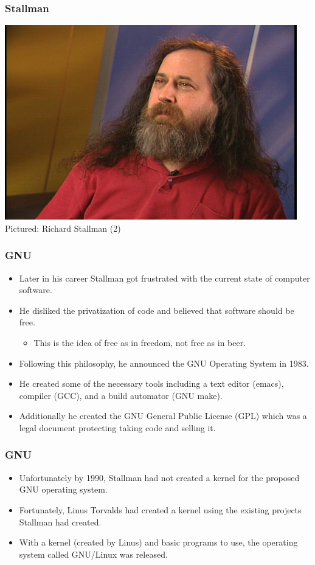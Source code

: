 \documentclass{beamer}
\begin{document}
\begin{frame}\frametitle{Stallman}
  \begin{center}
    \includegraphics[scale=.5, center]{stallman2.jpg}\\
    \small {Pictured: Richard Stallman (2)}
  \end{center}

\end{frame}

\begin{frame}\frametitle{GNU}
  \begin{itemize}
    \item Later in his career Stallman got frustrated with the current state of computer software.
    \item He disliked the privatization of code and believed that software should be free.
    \begin{itemize}
      \item This is the idea of free as in freedom, not free as in beer.
    \end{itemize}
    \item Following this philosophy, he announced the GNU Operating System in 1983.
    \item He created some of the necessary tools including a text editor (emacs), compiler (GCC), and a build automator (GNU make).
    \item Additionally he created the GNU General Public License (GPL) which was a legal document protecting taking code and selling it.
  \end{itemize}
\end{frame}

\begin{frame}\frametitle{GNU}
  \begin{itemize}
    \item Unfortunately by 1990, Stallman had not created a kernel for the proposed GNU operating system.
    \item Fortunately, Linus Torvalds had created a kernel using the existing projects Stallman had created.
    \item With a kernel (created by Linus) and basic programs to use, the operating system called GNU/Linux was released.
  \end{itemize}
\end{frame}
\end{document}
